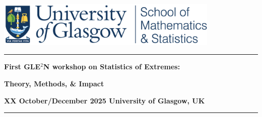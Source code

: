 \begin{titlepage}
\centering

\includegraphics[width=0.8\textwidth]{UofGMS_header.png}

\vspace*{4cm}

\noindent\rule{\textwidth}{1pt}
{\Large \bfseries First GLE$^2$N workshop on Statistics of Extremes:\par}

{\Huge \bfseries Theory, Methods, \& Impact \par}

{\large \bfseries XX October/December 2025 University of Glasgow, UK\par}

\noindent\rule{\textwidth}{1pt}
\vspace{1.5cm}






\end{titlepage}
\clearpage
\setcounter{page}{1}
